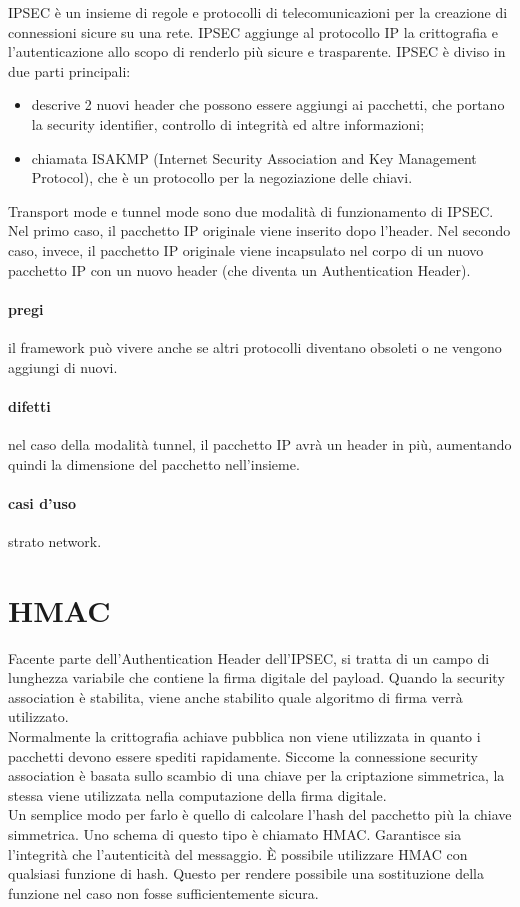 \documentclass{article}
\begin{document}
IPSEC è un insieme di regole e protocolli di telecomunicazioni per la creazione
di connessioni sicure su una rete. IPSEC aggiunge al protocollo IP la
crittografia e l'autenticazione allo scopo di renderlo più sicure e trasparente.
IPSEC è diviso in due parti principali:
\begin{itemize}
	\item descrive 2 nuovi header che possono essere aggiungi ai pacchetti, che
		portano la security identifier, controllo di integrità ed altre
		informazioni;

	\item chiamata ISAKMP (Internet Security Association and Key Management
		Protocol), che è un protocollo per la negoziazione delle chiavi.
\end{itemize}

Transport mode e tunnel mode sono due modalità di funzionamento di IPSEC.\\
Nel primo caso, il pacchetto IP originale viene inserito dopo l'header.
Nel secondo caso, invece, il pacchetto IP originale viene incapsulato nel corpo
di un nuovo pacchetto IP con un nuovo header (che diventa un Authentication
Header).

\paragraph{pregi} il framework può vivere anche se altri protocolli diventano
obsoleti o ne vengono aggiungi di nuovi.

\paragraph{difetti} nel caso della modalità tunnel, il pacchetto IP avrà un
header in più, aumentando quindi la dimensione del pacchetto nell'insieme.

\paragraph{casi d'uso} strato network.

\section{HMAC}

Facente parte dell'Authentication Header dell'IPSEC, si tratta di un campo di
lunghezza variabile che contiene la firma digitale del payload. Quando la
security association è stabilita, viene anche stabilito quale algoritmo di firma
verrà utilizzato.\\
Normalmente la crittografia  achiave pubblica non viene utilizzata in quanto i
pacchetti devono essere spediti rapidamente. Siccome la connessione security
association è basata sullo scambio di una chiave per la criptazione simmetrica,
la stessa viene utilizzata nella computazione della firma digitale.\\
Un semplice modo per farlo è quello di calcolare l'hash del pacchetto più la
chiave simmetrica. Uno schema di questo tipo è chiamato HMAC. Garantisce sia
l'integrità che l'autenticità del messaggio. È possibile utilizzare HMAC con
qualsiasi funzione di hash. Questo per rendere possibile una sostituzione della
funzione nel caso non fosse sufficientemente sicura.
\end{document}
